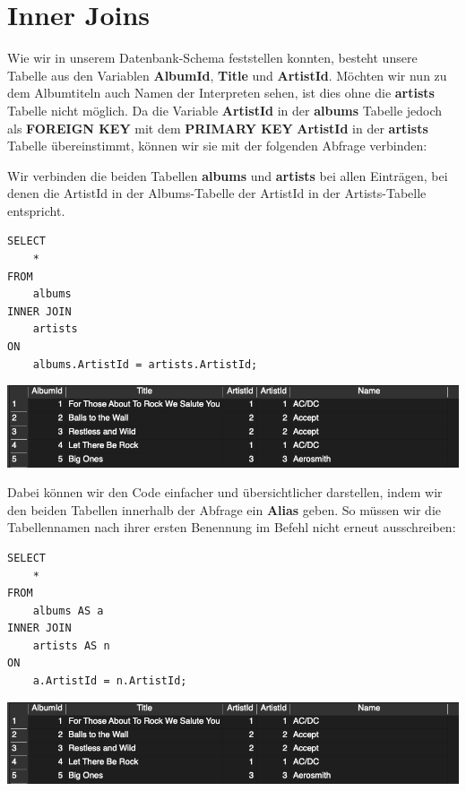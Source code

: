 \documentclass[
]{book}
\begin{document}
\hypertarget{inner-joins}{%
\section{Inner Joins}\label{inner-joins}}

Wie wir in unserem Datenbank-Schema feststellen konnten, besteht unsere Tabelle aus den Variablen \textbf{AlbumId}, \textbf{Title} und \textbf{ArtistId}. Möchten wir nun zu dem Albumtiteln auch Namen der Interpreten sehen, ist dies ohne die \textbf{artists} Tabelle nicht möglich. Da die Variable \textbf{ArtistId} in der \textbf{albums} Tabelle jedoch als \textbf{FOREIGN KEY} mit dem \textbf{PRIMARY KEY} \textbf{ArtistId} in der \textbf{artists} Tabelle übereinstimmt, können wir sie mit der folgenden Abfrage verbinden:

Wir verbinden die beiden Tabellen \textbf{albums} und \textbf{artists} bei allen Einträgen, bei denen die ArtistId in der Albums-Tabelle der ArtistId in der Artists-Tabelle entspricht.

\begin{verbatim}
SELECT
    *
FROM
    albums
INNER JOIN
    artists
ON
    albums.ArtistId = artists.ArtistId;
\end{verbatim}

\includegraphics[width=10.41667in,height=\textheight]{img-JOIN1.png}

Dabei können wir den Code einfacher und übersichtlicher darstellen, indem wir den beiden Tabellen innerhalb der Abfrage ein \textbf{Alias} geben. So müssen wir die Tabellennamen nach ihrer ersten Benennung im Befehl nicht erneut ausschreiben:

\begin{verbatim}
SELECT
    *
FROM
    albums AS a
INNER JOIN
    artists AS n
ON
    a.ArtistId = n.ArtistId;
\end{verbatim}

\includegraphics[width=10.41667in,height=\textheight]{img-JOIN1.png}
\end{document}
